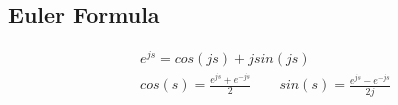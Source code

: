 \subsection{Euler Formula}
    \begin{align*}
        &e^{js} = cos(js) + j sin(js)\\
        &cos(s) = \frac{e^{js} + e^{-js}}{2} \quad \quad sin(s) = \frac{e^{js} - e^{-js}}{2j}
    \end{align*}